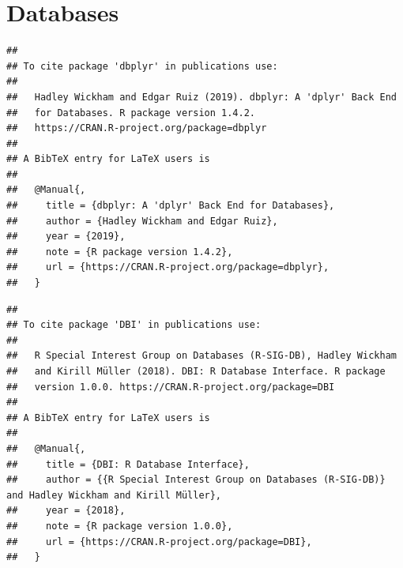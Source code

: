 \documentclass[krantz2]{krantz}\usepackage{knitr}%
\begin{document}
\section{Databases}\label{sec:data:db}
\begin{knitrout}\footnotesize
{}\color{fgcolor}\begin{kframe}
\begin{alltt}
\hlstd{(} \hlstd{=} \hlstd{)}
\end{alltt}
\begin{verbatim}
## 
## To cite package 'dbplyr' in publications use:
## 
##   Hadley Wickham and Edgar Ruiz (2019). dbplyr: A 'dplyr' Back End
##   for Databases. R package version 1.4.2.
##   https://CRAN.R-project.org/package=dbplyr
## 
## A BibTeX entry for LaTeX users is
## 
##   @Manual{,
##     title = {dbplyr: A 'dplyr' Back End for Databases},
##     author = {Hadley Wickham and Edgar Ruiz},
##     year = {2019},
##     note = {R package version 1.4.2},
##     url = {https://CRAN.R-project.org/package=dbplyr},
##   }
\end{verbatim}
\end{kframe}
\end{knitrout}
\begin{knitrout}\footnotesize
{}\color{fgcolor}\begin{kframe}
\begin{alltt}
\hlstd{(} \hlstd{=} \hlstd{)}
\end{alltt}
\begin{verbatim}
## 
## To cite package 'DBI' in publications use:
## 
##   R Special Interest Group on Databases (R-SIG-DB), Hadley Wickham
##   and Kirill Müller (2018). DBI: R Database Interface. R package
##   version 1.0.0. https://CRAN.R-project.org/package=DBI
## 
## A BibTeX entry for LaTeX users is
## 
##   @Manual{,
##     title = {DBI: R Database Interface},
##     author = {{R Special Interest Group on Databases (R-SIG-DB)} and Hadley Wickham and Kirill Müller},
##     year = {2018},
##     note = {R package version 1.0.0},
##     url = {https://CRAN.R-project.org/package=DBI},
##   }
\end{verbatim}
\end{kframe}
\end{knitrout}
\end{document}
